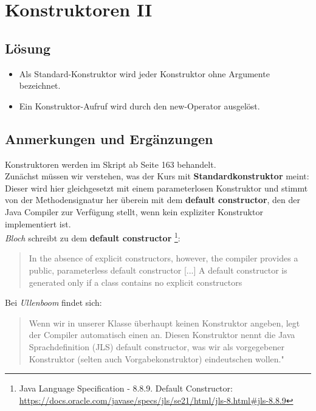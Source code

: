 \chapter{Konstruktoren II}\label{konstruktoren}

\section*{Lösung}

\begin{itemize}
    \item Als Standard-Konstruktor wird jeder Konstruktor ohne Argumente bezeichnet.
    \item Ein Konstruktor-Aufruf wird durch den new-Operator ausgelöst.
\end{itemize}


\section*{Anmerkungen und Ergänzungen}

Konstruktoren werden im Skript ab Seite 163 behandelt.\\

Zunächst müssen wir verstehen, was der Kurs mit \textbf{Standardkonstruktor} meint: Dieser wird hier gleichgesetzt
mit einem parameterlosen Konstruktor und stimmt von der Methodensignatur her überein mit dem \textbf{default constructor},
den der Java Compiler zur Verfügung stellt, wenn kein expliziter Konstruktor implementiert ist.\\

\textit{Bloch} schreibt zu dem \textbf{default constructor} \footnote{
    Java Language Specification - 8.8.9. Default Constructor: \url{https://docs.oracle.com/javase/specs/jls/se21/html/jls-8.html#jls-8.8.9}
}:

\blockquote[{\cite[19 f.]{Blo17}}]{
    In the absence of explicit constructors, however, the compiler provides a public, parameterless default constructor [...]
    A default constructor is generated only if a class contains no explicit constructors
}

Bei \textit{Ullenboom} findet sich:

\blockquote[{\cite[515]{Ull12}}]{
    Wenn wir in unserer Klasse überhaupt keinen Konstruktor angeben, legt der Compiler automatisch einen an. Diesen
    Konstruktor nennt die Java Sprachdefinition (JLS) default constructor, was wir als vorgegebener Konstruktor
    (selten auch Vorgabekonstruktor) eindeutschen wollen."
}

